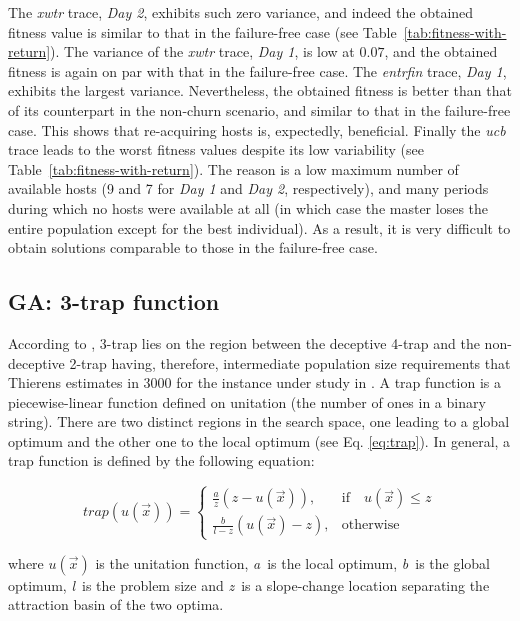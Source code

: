 \documentclass[graybox]{sty/svmult}
\begin{document}
The \emph{xwtr} trace,
\emph{Day 2}, exhibits such zero variance, and indeed the obtained
fitness value is similar to that in the failure-free case
(see Table~\ref{tab:fitness-with-return}). The variance of
the \emph{xwtr} trace, \emph{Day 1}, is low at $0.07$, and the
obtained fitness is again on par with that in the failure-free case.
The \emph{entrfin} trace, \emph{Day 1}, exhibits the largest
variance.  Nevertheless, the obtained fitness is better than that
of its counterpart in the non-churn scenario, and
similar to that in the failure-free case.  This shows that re-acquiring
hosts is, expectedly, beneficial.  Finally the \emph{ucb} trace
leads to the worst fitness values despite its low variability (see
Table~\ref{tab:fitness-with-return}). The reason is a low maximum
number of available hosts (9 and 7 for \emph{Day 1} and \emph{Day 2},
respectively), and many periods during which no hosts were available at
all (in which case the master loses the entire population except for the
best individual). As a result, it is very difficult to obtain solutions
comparable to those in the failure-free case.


\subsection{GA: 3-trap function}

According to \cite{deb:deception}, 3-trap lies on the region between the deceptive 4-trap and the non-deceptive 2-trap having, therefore, intermediate population size requirements that Thierens estimates in 3000 for the instance under study in \cite{thierens99:scalability}.
 A trap function is a piecewise-linear function defined on
unitation (the number of ones in a binary string). There are two distinct regions in the search space, one leading to a
global optimum and the other one to the local optimum (see Eq. \ref{eq:trap}).  In general, a trap function is defined by the following equation:


\begin{equation} \label{eq:trap}
trap(u(\overrightarrow{x}))=\left\{
\begin{array}{ll}
\frac{a}{z}(z-u(\overrightarrow{x})), & \mbox{if}\quad u(\overrightarrow{x}) \leq z \\
\frac{b}{l-z}(u(\overrightarrow{x})-z), & \mbox{otherwise}
\end{array} \right.
\end{equation}

\noindent
where $u(\overrightarrow{x})$ is the unitation function, \textit{a}\ is the local optimum, \textit{b}\ is the global optimum, \textit{l}\ is the problem size and \textit{z}\ is a slope-change location separating the attraction basin of the two optima. 
\end{document}
